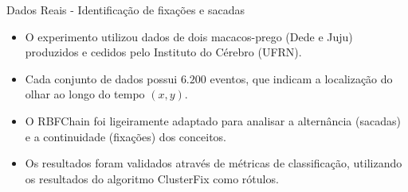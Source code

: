 \documentclass[10pt]{beamer}
\begin{document}
\begin{frame}{Dados Reais - Identificação de fixações e sacadas}
    \begin{itemize}
        \item O experimento utilizou dados de dois macacos-prego (Dede e Juju) produzidos e cedidos pelo Instituto do Cérebro (UFRN).
        \item Cada conjunto de dados possui $6.200$ eventos, que indicam a localização do olhar ao longo do tempo $(x, y)$.
        \item O RBFChain foi ligeiramente adaptado para analisar a alternância (sacadas) e a continuidade (fixações) dos conceitos.
        \item Os resultados foram validados através de métricas de classificação, utilizando os resultados do algoritmo ClusterFix \cite{KONIG2014121} como rótulos.
    \end{itemize}
\end{frame}
\end{document}

